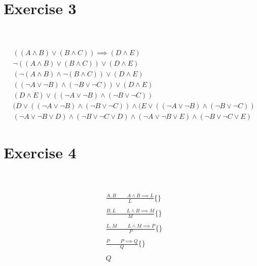 \documentclass{article}
\begin{document}
\section*{Exercise 3}
\paragraph{}~\\~\\
\begin{equation}
\begin{aligned}
&((A \land B) \lor (B \land C)) \implies (D \land E)\\
&\lnot ((A \land B) \lor (B \land C)) \lor (D \land E)\\
&(\lnot (A \land B) \land \lnot(B \land C)) \lor (D \land E)\\
&((\lnot A \lor \lnot B) \land (\lnot B \lor \lnot C)) \lor (D \land E)\\
&(D \land E) \lor ((\lnot A \lor \lnot B) \land (\lnot B \lor \lnot C))\\
&(D \lor ((\lnot A \lor \lnot B) \land (\lnot B \lor \lnot C))\land (E \lor ((\lnot A \lor \lnot B) \land (\lnot B \lor \lnot C))\\
&(\lnot A \lor \lnot B \lor D) \land (\lnot B \lor \lnot C \lor D)\land (\lnot A \lor \lnot B \lor E) \land (\lnot B \lor \lnot C \lor E)
\end{aligned}
\end{equation}
\newpage
\section*{Exercise 4}
\paragraph{}~\\~\\
\begin{equation}
\begin{aligned}
&\frac{A,B~~~~~~~~~~A\land B \implies L} {L} \text{\{\}}\\
& \\
&\frac{B,L~~~~~~~~~~L\land B \implies M} {M} \text{\{\}}\\
& \\
&\frac{L,M~~~~~~~~~~L\land M \implies P} {P} \text{\{\}}\\
& \\
&\frac{P~~~~~~~~~~P \implies Q} {Q} \text{\{\}}\\
& \\
&Q
\end{aligned}
\end{equation}
\end{document}
